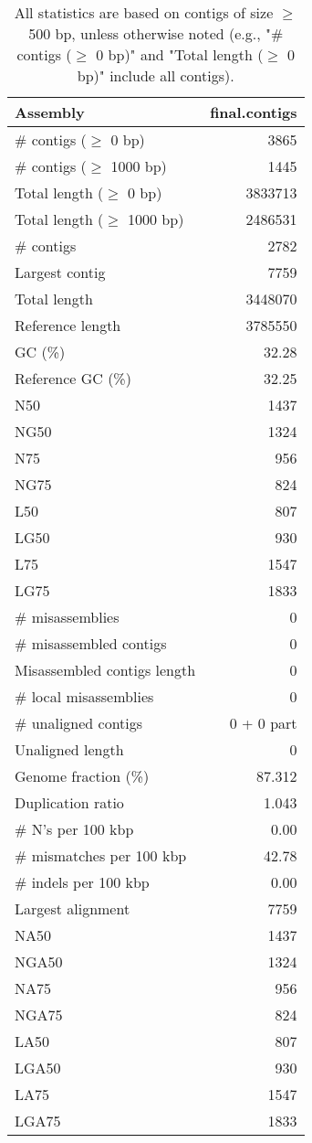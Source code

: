 \documentclass[12pt,a4paper]{article}
\begin{document}
\begin{table}[ht]
\begin{center}
\caption{All statistics are based on contigs of size $\geq$ 500 bp, unless otherwise noted (e.g., "\# contigs ($\geq$ 0 bp)" and "Total length ($\geq$ 0 bp)" include all contigs).}
\begin{tabular}{|l*{1}{|r}|}
\hline
Assembly & final.contigs \\ \hline
\# contigs ($\geq$ 0 bp) & 3865 \\ \hline
\# contigs ($\geq$ 1000 bp) & 1445 \\ \hline
Total length ($\geq$ 0 bp) & 3833713 \\ \hline
Total length ($\geq$ 1000 bp) & 2486531 \\ \hline
\# contigs & 2782 \\ \hline
Largest contig & 7759 \\ \hline
Total length & 3448070 \\ \hline
Reference length & 3785550 \\ \hline
GC (\%) & 32.28 \\ \hline
Reference GC (\%) & 32.25 \\ \hline
N50 & 1437 \\ \hline
NG50 & 1324 \\ \hline
N75 & 956 \\ \hline
NG75 & 824 \\ \hline
L50 & 807 \\ \hline
LG50 & 930 \\ \hline
L75 & 1547 \\ \hline
LG75 & 1833 \\ \hline
\# misassemblies & 0 \\ \hline
\# misassembled contigs & 0 \\ \hline
Misassembled contigs length & 0 \\ \hline
\# local misassemblies & 0 \\ \hline
\# unaligned contigs & 0 + 0 part \\ \hline
Unaligned length & 0 \\ \hline
Genome fraction (\%) & 87.312 \\ \hline
Duplication ratio & 1.043 \\ \hline
\# N's per 100 kbp & 0.00 \\ \hline
\# mismatches per 100 kbp & 42.78 \\ \hline
\# indels per 100 kbp & 0.00 \\ \hline
Largest alignment & 7759 \\ \hline
NA50 & 1437 \\ \hline
NGA50 & 1324 \\ \hline
NA75 & 956 \\ \hline
NGA75 & 824 \\ \hline
LA50 & 807 \\ \hline
LGA50 & 930 \\ \hline
LA75 & 1547 \\ \hline
LGA75 & 1833 \\ \hline
\end{tabular}
\end{center}
\end{table}
\end{document}
